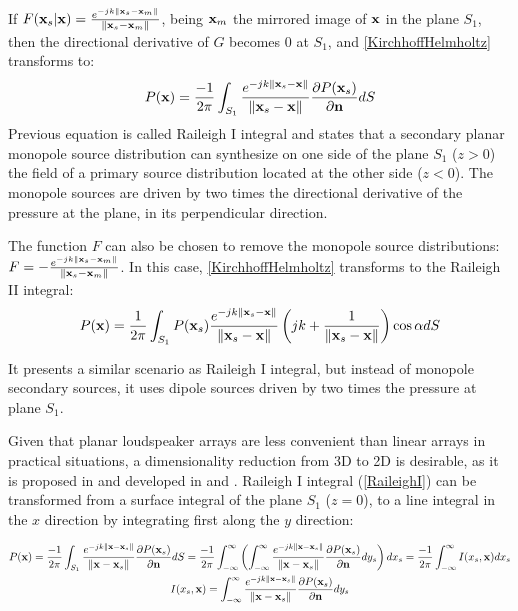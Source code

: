 If $F(\PosTheo[surface] \vert \PosTheo) = \GreenFunc[ {\PosTheo[surface] - \PosTheo[mirrored]} ]$, being $\PosTheo[mirrored]$ the mirrored image of $\PosTheo$ in the plane $S_1$, then the directional derivative of $G$ becomes $0$ at $S_1$, and \autoref{KirchhoffHelmholtz} transforms to:
\begin{equation}
P(\PosTheo) = \frac{-1}{2\pi} \int_{S_1} \GreenFunc[{\PosTheo[surface] - \PosTheo}] \frac{\partial P(\PosTheo[surface])}{\partial \mathbf{n}} dS
\label{RaileighI}
\end{equation}
Previous equation is called Raileigh I integral and states that a secondary planar monopole source distribution can synthesize on one side of the plane $S_1$ ($z>0$) the field of a primary source distribution located at the other side ($z<0$). The monopole sources are driven by two times the directional derivative of the pressure at the plane, in its perpendicular direction.

The function $F$ can also be chosen to remove the monopole source distributions: $F = -\GreenFunc[ {\PosTheo[surface] - \PosTheo[mirrored]} ]$. In this case, \autoref{KirchhoffHelmholtz} transforms to the Raileigh II integral:
\begin{equation}
P(\PosTheo) = \frac{1}{2\pi} \int_{S_1} P(\PosTheo[surface]) \GreenFunc[{\PosTheo[surface] - \PosTheo}] \left(jk + \frac{1}{\norm{\PosTheo[surface] - \PosTheo}}\right)\cos\alpha dS
\end{equation}

It presents a similar scenario as Raileigh I integral, but instead of monopole secondary sources, it uses dipole sources driven by two times the pressure at plane $S_1$.

Given that planar loudspeaker arrays are less convenient than linear arrays in practical situations, a dimensionality reduction from 3D to 2D is desirable, as it is proposed in \cite{Vogel} and developed in \cite{stuart1996application} and \cite{Verheijen}.  Raileigh I integral (\autoref{RaileighI}) can be transformed from a surface integral of the plane $S_1$ ($z=0$), to a line integral in the $x$ direction by integrating first along the $y$ direction:

\begin{gather}
P(\PosTheo) = \frac{-1}{2\pi} \int_{S_1} \GreenFunc[{\PosTheo - \PosTheo[surface]}] \frac{\partial P(\PosTheo[surface])}{\partial \mathbf{n}} dS = \frac{-1}{2\pi} \int_{-\infty}^{\infty} \left( \int_{-\infty}^{\infty} \GreenFunc[{\PosTheo - \PosTheo[surface]}] \frac{\partial P(\PosTheo[surface])}{\partial \mathbf{n}} dy_s \right) dx_s = \frac{-1}{2\pi} \int_{-\infty}^{\infty} I(x_s, \PosTheo) dx_s \\
I(x_s, \PosTheo) = \int_{-\infty}^{\infty} \GreenFunc[{\PosTheo - \PosTheo[surface]}] \frac{\partial P(\PosTheo[surface])}{\partial \mathbf{n}} dy_s
\label{LineIntegral}
\end{gather}

